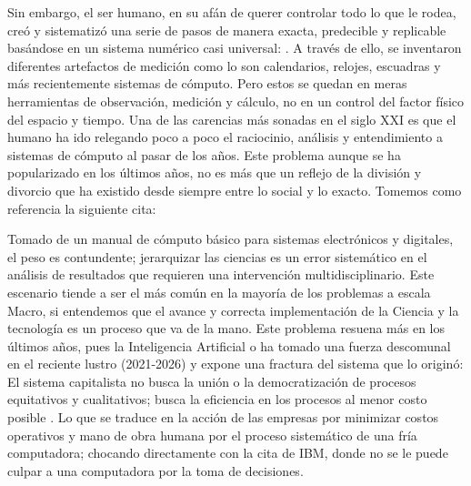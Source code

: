 Sin embargo, el ser humano, en su afán de querer controlar todo lo que le rodea, creó y sistematizó una 
serie de pasos de manera exacta, predecible y replicable basándose en un sistema numérico casi universal: 
. A través de ello, se inventaron diferentes artefactos de medición como lo 
son calendarios, relojes, escuadras y más recientemente sistemas de cómputo. Pero estos se quedan en 
meras herramientas de observación, medición y cálculo, no en un control del factor físico del espacio 
y tiempo. Una de las carencias más sonadas en el siglo XXI es que el humano ha ido relegando poco a poco
el raciocinio, análisis y entendimiento a sistemas de cómputo al pasar de los años. Este problema aunque 
se ha popularizado en los últimos años, no es más que un reflejo de la división y divorcio que ha existido 
desde siempre entre lo social y lo exacto. Tomemos como referencia la siguiente cita:
\begin{nopagebreak}
\end{nopagebreak}

Tomado de un manual de cómputo básico para sistemas electrónicos y digitales, el peso es contundente; 
jerarquizar las ciencias es un error sistemático en el análisis de resultados que requieren una 
intervención multidisciplinario. \cite{lefebvre_rural} Este escenario tiende a ser el más común en 
la mayoría de los problemas a escala Macro, si entendemos que el avance y correcta implementación 
de la Ciencia y la tecnología es un proceso que va de la mano. Este problema resuena más en los 
últimos años, pues la Inteligencia Artificial o  ha tomado una fuerza descomunal en el 
reciente lustro (2021-2026) y expone una fractura del sistema que lo originó: El sistema capitalista 
no busca la unión o la democratización de procesos equitativos y cualitativos; busca la eficiencia 
en los procesos al menor costo posible \cite{bauman_globalizacion_1999}. Lo que se traduce en la 
acción de las empresas por minimizar costos operativos y mano de obra humana por el proceso 
sistemático de una fría computadora; chocando directamente con la cita de IBM, donde no se le 
puede culpar a una computadora por la toma de decisiones.

